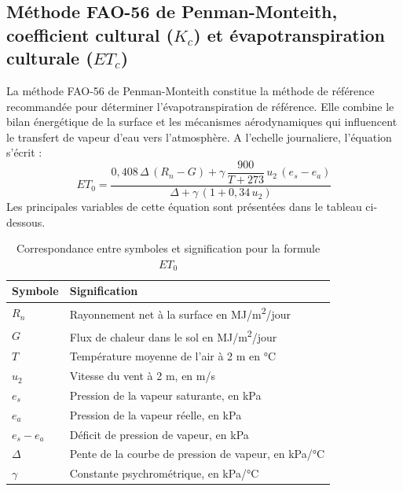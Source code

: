 \subsection{Méthode FAO-56 de Penman-Monteith, coefficient cultural (\texorpdfstring{$K_c$}{Kc}) et évapotranspiration culturale (\texorpdfstring{$ET_c$}{ETc})}

La méthode FAO-56 de Penman-Monteith \cite{allen_crop_1998-1} constitue la méthode de référence recommandée pour déterminer l'évapotranspiration de référence. Elle combine le bilan énergétique de la surface et les mécanismes aérodynamiques qui influencent le transfert de vapeur d’eau vers l'atmosphère. A l’echelle journaliere, l'équation s'écrit :
\begin{equation}
    ET_0 = \frac{0{,}408\,\Delta\,(R_n - G) + \gamma\,\dfrac{900}{T + 273}\,u_2\,(e_s - e_a)}{\Delta + \gamma\,(1 + 0{,}34\,u_2)}
    \label{eq:penman_monteith}
\end{equation}
Les principales variables de cette équation sont présentées dans le tableau ci-dessous.

\begin{table}[H]
    \centering
    \caption{Correspondance entre symboles et signification pour la formule $ET_0$}
    \label{tab:symboles_et0}
    \begin{tabular}{|p{3cm}|p{10cm}|}
        \hline
        \textbf{Symbole} & \textbf{Signification} \\
        \hline
        $R_n$ & Rayonnement net à la surface en MJ/m\textsuperscript{2}/jour \\
        \hline
        $G$ & Flux de chaleur dans le sol en MJ/m\textsuperscript{2}/jour \\
        \hline
        $T$ & Température moyenne de l'air à 2 m en °C \\
        \hline
        $u_2$ & Vitesse du vent à 2 m, en m/s \\
        \hline
        $e_s$ & Pression de la vapeur saturante, en kPa \\
        \hline
        $e_a$ & Pression de la vapeur réelle, en kPa \\
        \hline
        $e_s - e_a$ & Déficit de pression de vapeur, en kPa \\
        \hline
        $\Delta$ & Pente de la courbe de pression de vapeur, en kPa/°C \\
        \hline
        $\gamma$ & Constante psychrométrique, en kPa/°C \\
        \hline
    \end{tabular}
\end{table}

